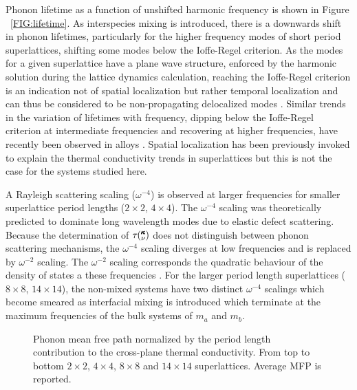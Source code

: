 \documentclass[aps,prb,preprint,preprintnumbers,amsmath,amssymb,floatfix,superscriptaddress]{revtex4}
\newcommand{\kv}{\mspace{-4.0mu}\left(\mspace{-8.0mu}
\begin{smallmatrix}&\pmb{\kappa} \\&\nu\end{smallmatrix}
\mspace{-3.0mu}\right)}
\begin{document}
Phonon lifetime as a function of unshifted harmonic frequency is shown in Figure ~\ref{FIG:lifetime}. As interspecies mixing is introduced, there is a downwards shift in phonon lifetimes, particularly for the higher frequency modes of short period superlattices, shifting some modes below the Ioffe-Regel criterion. As the modes for a given superlattice have a plane wave structure, enforced by the harmonic solution during the lattice dynamics calculation, reaching the Ioffe-Regel criterion is an indication not of spatial localization but rather temporal localization and can thus be considered to be non-propagating delocalized modes \cite{allen_thermal_1993}. Similar trends in the variation of lifetimes with frequency, dipping below the Ioffe-Regel criterion at intermediate frequencies and recovering at higher frequencies, have recently been observed in alloys \cite{jason2013vc}. Spatial localization has been previously invoked to explain the thermal conductivity trends in superlattices \cite{PhysRevB.61.3091} but this is not the case for the systems studied here.

A Rayleigh scattering scaling ($\omega^{-4}$) is observed at larger frequencies for smaller superlattice period lengths ($2\times2$, $4\times4$). The $\omega^{-4}$ scaling was theoretically predicted to dominate long wavelength modes due to elastic defect scattering\cite{PhysRev.140.A1812,klemens_scattering_1955-3, klemens_thermal_1957-2}. Because the determination of $\tau\kv$ does not distinguish between phonon scattering mechanisms, the $\omega^{-4}$ scaling diverges at low frequencies and is replaced by $\omega^{-2}$ scaling. The $\omega^{-2}$ scaling corresponds the quadratic behaviour of the density of states a these frequencies \cite{Klemens_Thermal_1951}. For the larger period length superlattices ($8\times8$, $14\times14$), the non-mixed systems have two distinct $\omega^{-4}$ scalings which become smeared as interfacial mixing is introduced which terminate at the maximum frequencies of the bulk systems of $m_a$ and $m_b$.

\begin{figure}%
\begin{center}
\renewcommand{\figure}{Fig.}
\caption{Phonon mean free path normalized by the period length contribution to the cross-plane thermal conductivity. From top to bottom $2\times2$, $4\times4$, $8\times8$ and $14\times14$ superlattices. Average MFP is reported.}
\label{FIG:MFP_cp}
\end{center}
\end{figure}
\end{document}
